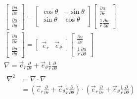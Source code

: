 	{}
	\[ 
\begin{aligned}
	 &\begin{bmatrix}
		\frac{\partial u}{\partial x} \\
		\frac{\partial u}{\partial y} 
	 \end{bmatrix}
	 =
	 \begin{bmatrix}
		 \cos \theta &  -\sin \theta \\
		 \sin \theta& \cos \theta \\  
	 \end{bmatrix}
	 \begin{bmatrix}
		 \frac{\partial u}{\partial r} \\
		\frac{1}{r} \frac{\partial u}{\partial \theta} 
	  \end{bmatrix}\\
	&\begin{bmatrix}
		\frac{\partial u}{\partial x} \\
		\frac{\partial u}{\partial y} 
	 \end{bmatrix}
	 =
	 \begin{bmatrix}
		 \vec{e}_r & \vec{e}_\theta 
	 \end{bmatrix}
	 \begin{bmatrix}
		 \frac{\partial u}{\partial r} \\
		\frac{1}{r} \frac{\partial u}{\partial \theta} 
	  \end{bmatrix} \\
	&\nabla= \vec{e}_r \frac{\partial }{\partial r} +   \vec{e}_\theta \frac{1}{r} \frac{\partial }{\partial \theta} \\
	&\begin{aligned}
		\nabla ^2 &=\nabla \cdot \nabla \\
		&= (\vec{e}_r \frac{\partial }{\partial r} +   \vec{e}_\theta  \frac{1}{r}\frac{\partial }{\partial \theta})\cdot (\vec{e}_r \frac{\partial }{\partial r} +   \vec{e}_\theta \frac{1}{r} \frac{\partial }{\partial \theta})\\
	\end{aligned}	
\end{aligned}	
	\] 



